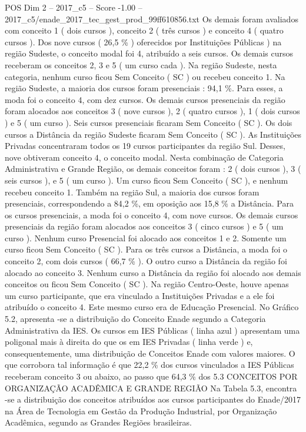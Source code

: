 \begin{textsample}{POS Dim 2 – 2017\_c5 – Score -1.00 – 2017\_c5/enade\_2017\_tec\_gest\_prod\_99ff610856.txt}
Os demais foram avaliados com conceito 1 ( dois cursos ), conceito 2 ( três cursos ) e conceito 4 ( quatro cursos ).
Dos nove cursos ( 26,5 \% ) oferecidos por Instituições Públicas ) na região Sudeste, o conceito modal foi 4, atribuído a seis cursos.
Os demais cursos receberam os conceitos 2, 3 e 5 ( um curso cada ).
Na região Sudeste, nesta categoria, nenhum curso ficou Sem Conceito ( SC ) ou recebeu conceito 1.
Na região Sudeste, a maioria dos cursos foram presenciais : 94,1 \%.
Para esses, a moda foi o conceito 4, com dez cursos.
Os demais cursos presenciais da região foram alocados aos conceitos 3 ( nove cursos ), 2 ( quatro cursos ), 1 ( dois cursos ) e 5 ( um curso ).
Seis cursos presenciais ficaram Sem Conceito ( SC ).
Os dois cursos a Distância da região Sudeste ficaram Sem Conceito ( SC ).
As Instituições Privadas concentraram todos os 19 cursos participantes da região Sul.
Desses, nove obtiveram conceito 4, o conceito modal.
Nesta combinação de Categoria Administrativa e Grande Região, os demais conceitos foram : 2 ( dois cursos ), 3 ( seis cursos ), e 5 ( um curso ).
Um curso ficou Sem Conceito ( SC ), e nenhum recebeu conceito 1.
Também na região Sul, a maioria dos cursos foram presenciais, correspondendo a 84,2 \%, em oposição aos 15,8 \% a Distância.
Para os cursos presenciais, a moda foi o conceito 4, com nove cursos.
Os demais cursos presenciais da região foram alocados aos conceitos 3 ( cinco cursos ) e 5 ( um curso ).
Nenhum curso Presencial foi alocado aos conceitos 1 e 2.
Somente um curso ficou Sem Conceito ( SC ).
Para os três cursos a Distância, a moda foi o conceito 2, com dois cursos ( 66,7 \% ).
O outro curso a Distância da região foi alocado ao conceito 3.
Nenhum curso a Distância da região foi alocado aos demais conceitos ou ficou Sem Conceito ( SC ).
Na região Centro-Oeste, houve apenas um curso participante, que era vinculado a Instituições Privadas e a ele foi atribuído o conceito 4.
Este mesmo curso era de Educação Presencial.
No Gráfico 5.2, apresenta -se a distribuição do Conceito Enade segundo a Categoria Administrativa da IES.
Os cursos em IES Públicas ( linha azul ) apresentam uma poligonal mais à direita do que os em IES Privadas ( linha verde ) e, consequentemente, uma distribuição de Conceitos Enade com valores maiores.
O que corrobora tal informação é que 22,2 \% dos cursos vinculados a IES Públicas receberam conceito 3 ou abaixo, ao passo que 64,3 \% dos 5.3 CONCEITOS POR ORGANIZAÇÃO ACADÊMICA E GRANDE REGIÃO Na Tabela 5.3, encontra -se a distribuição dos conceitos atribuídos aos cursos participantes do Enade/2017 na Área de Tecnologia em Gestão da Produção Industrial, por Organização Acadêmica, segundo as Grandes Regiões brasileiras.

\end{textsample}
